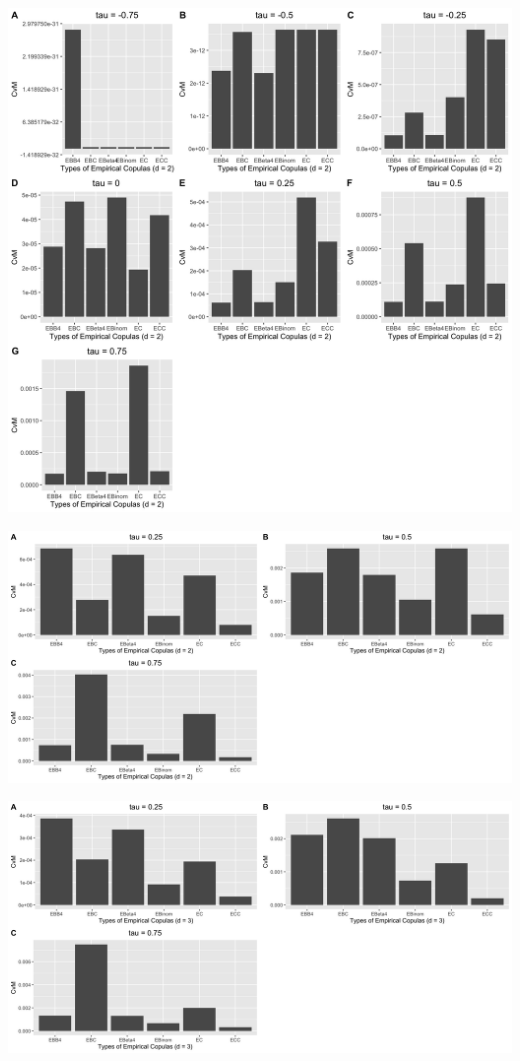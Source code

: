 \documentclass[12pt]{report}
\newcommand{\1}{\mathbf{1}}
\begin{document}
\begin{flushleft}
\begin{center}
\label{N_2d_c_CvM}
\includegraphics[width=17cm]{CumulativeCvM/N_2d_c_CvM.png}
\end{center}%

\begin{center}
\label{C_2d_c_CvM}
\includegraphics[width=17cm]{CumulativeCvM/C_2d_c_CvM.png}
\end{center}%

\begin{center}
\label{C_3d_c_CvM}
\includegraphics[width=17cm]{CumulativeCvM/C_3d_c_CvM.png}
\end{center}%


\end{flushleft}
\end{document}
